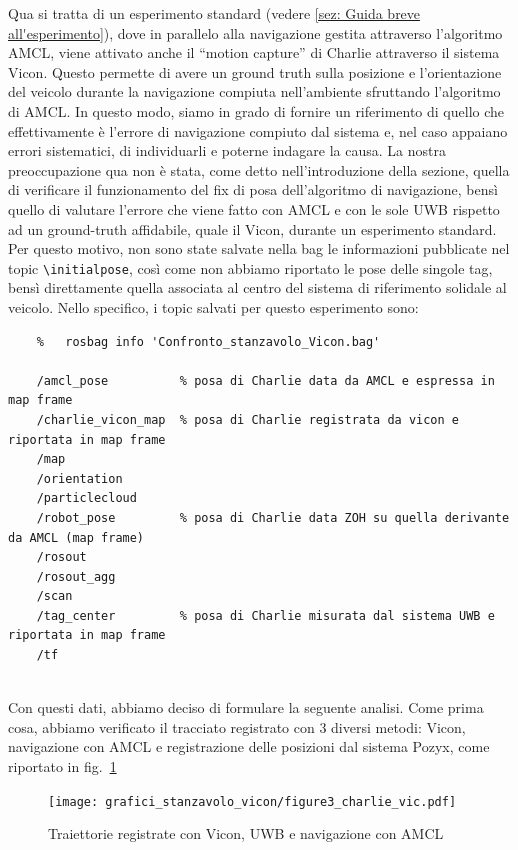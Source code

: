 Qua si tratta di un esperimento standard (vedere \ref{sez: Guida breve all'esperimento}), dove in parallelo alla navigazione gestita attraverso l'algoritmo AMCL, viene attivato anche il ``motion capture''
di Charlie attraverso il sistema Vicon. Questo permette di avere un ground truth sulla posizione e l'orientazione del veicolo durante la navigazione compiuta
nell'ambiente sfruttando l'algoritmo di AMCL. In questo modo, siamo in grado di fornire un riferimento di quello che effettivamente è l'errore di navigazione compiuto dal sistema e, nel caso appaiano errori sistematici, di individuarli e poterne indagare la causa.
La nostra preoccupazione qua non è stata, come detto nell'introduzione della sezione, quella di verificare il funzionamento del fix di posa dell'algoritmo di navigazione, bensì quello di valutare l'errore che viene fatto con AMCL e con le sole UWB rispetto ad un ground-truth affidabile, quale il Vicon, durante un esperimento standard. Per questo motivo, non sono state salvate nella bag le informazioni pubblicate nel topic \verb|\initialpose|, così come non abbiamo riportato le pose delle singole tag, bensì direttamente quella associata al centro del sistema di riferimento solidale al veicolo.
Nello specifico, i topic salvati per questo esperimento sono:
\begin{verbatim}
	%	rosbag info 'Confronto_stanzavolo_Vicon.bag'
	
	/amcl_pose			% posa di Charlie data da AMCL e espressa in map frame 
	/charlie_vicon_map	% posa di Charlie registrata da vicon e riportata in map frame
	/map
	/orientation
	/particlecloud
	/robot_pose			% posa di Charlie data ZOH su quella derivante da AMCL (map frame)
	/rosout
	/rosout_agg
	/scan   
	/tag_center			% posa di Charlie misurata dal sistema UWB e riportata in map frame
	/tf     
	
\end{verbatim}

Con questi dati, abbiamo deciso di formulare la seguente analisi.
Come prima cosa, abbiamo verificato il tracciato registrato con 3 diversi metodi: Vicon, navigazione con AMCL e registrazione delle posizioni dal sistema Pozyx, come riportato in fig.~\ref{fig: traiettorie_vicon_charlie}

\begin{figure}[] 
	\centering    
	\texttt{[image: grafici\_stanzavolo\_vicon/figure3\_charlie\_vic.pdf]}
	\caption{Traiettorie registrate con Vicon, UWB e navigazione con AMCL}
	\label{fig: traiettorie_vicon_charlie}
\end{figure}

